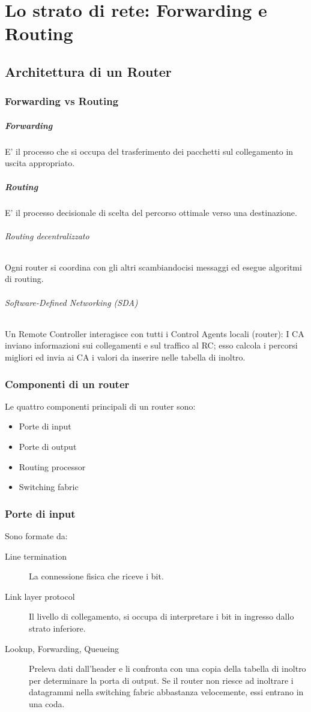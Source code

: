 \chapter{Lo strato di rete: Forwarding e Routing}
\section{Architettura di un Router}
\subsection{Forwarding vs Routing}
\paragraph{Forwarding} 

E' il processo che si occupa del trasferimento dei pacchetti sul collegamento in uscita appropriato.
\paragraph{Routing} 

E' il processo decisionale di scelta del percorso ottimale verso una destinazione.
\subparagraph{Routing decentralizzato} Ogni router si coordina con gli altri scambiandocisi messaggi ed esegue algoritmi di routing.
\subparagraph{Software-Defined Networking (SDA)} Un Remote Controller interagisce con tutti i Control Agents locali (router): I CA inviano informazioni sui collegamenti e sul traffico al RC; esso calcola i percorsi migliori ed invia ai CA i valori da inserire nelle tabella di inoltro.
\subsection{Componenti di un router}
Le quattro componenti principali di un router sono:
\begin{itemize}
    \item Porte di input
    \item Porte di output
    \item Routing processor
    \item Switching fabric
\end{itemize}
\subsection{Porte di input}
Sono formate da:
\begin{description}
    \item[Line termination] La connessione fisica che riceve i bit.
    \item[Link layer protocol] Il livello di collegamento, si occupa di interpretare i bit in ingresso dallo strato inferiore.
    \item[Lookup, Forwarding, Queueing] Preleva dati dall'header e li confronta con una copia della tabella di inoltro per determinare la porta di output. Se il router non riesce ad inoltrare i datagrammi nella switching fabric abbastanza velocemente, essi entrano in una coda.
\end{description}

